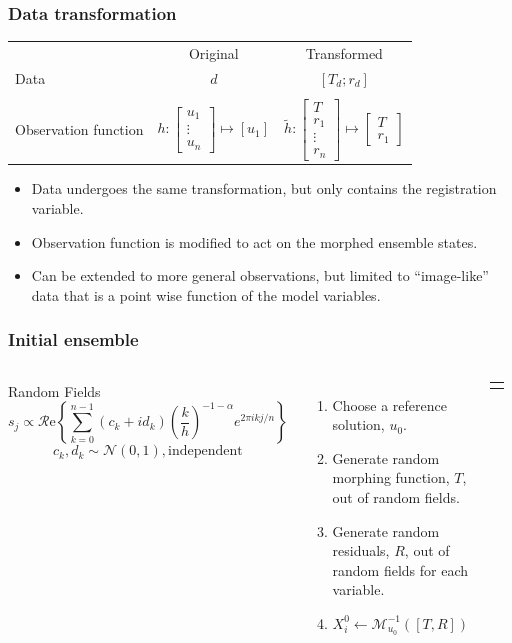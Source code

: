 \documentclass{beamer}
\begin{document}
\begin{frame}
\frametitle{Data transformation}
\begin{tabular}{l|c|c|}
&Original&Transformed\\
Data&
$d$&$\left[T_d;r_d\right]$\\
&&\\
Observation function&
$h:
\left[
\begin{array}{c}
u_1\\
\vdots\\
u_n
\end{array}
\right]\mapsto \left[u_1\right]$&$\tilde{h}:
\left[
\begin{array}{c}
T\\
r_1\\
\vdots\\
r_n
\end{array}
\right]\mapsto \left[\begin{array}{c}T\\r_1\end{array}\right]$
\end{tabular}
\vspace{.1in}
\begin{itemize}
\item Data undergoes the same transformation, but only contains the registration variable.
\item Observation function is modified to act on the morphed ensemble states.
\item Can be extended to more general observations, but limited to ``image-like'' data that is a point wise function of the model variables.
\end{itemize}
\end{frame}

\begin{frame}
\frametitle{Initial ensemble}
\begin{columns}[c]
\begin{block}{Random Fields}
{\footnotesize
\[s_{j}\propto\mathcal{R}\mathrm{e}\left\{
\sum_{k=0}^{n-1}(c_{k}+id_{k})\left(\frac{k}{h}\right)^{-1-\alpha}
e^{2\pi i kj/n} \right\}\]
\[c_k,d_k\sim \mathcal{N}(0,1), \mbox{independent}\]}\end{block}
\begin{enumerate}
\item Choose a reference solution, $u_0$.
\item Generate random morphing function, $T$, out of random fields.
\item Generate random residuals, $R$, out of random fields for each variable.
\item $X^0_i\leftarrow \mathcal{M}^{-1}_{u_0}([T,R])$
\end{enumerate}
\begin{tabular}{c}
\\
\\

\end{tabular}
\end{columns}
\end{frame}
\end{document}
